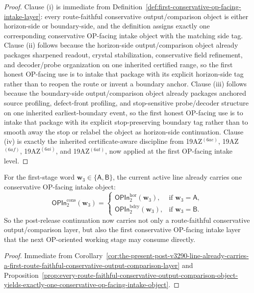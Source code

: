 \begin{proof}
Clause (i) is immediate from Definition~\ref{def:first-conservative-op-facing-intake-layer}: every route-faithful conservative output/comparison object is either horizon-side or boundary-side, and the definition assigns exactly one corresponding conservative OP-facing intake object with the matching side tag. Clause (ii) follows because the horizon-side output/comparison object already packages sharpened readout, crystal stabilization, conservative field refinement, and decoder/probe organization on one inherited certified range, so the first honest OP-facing use is to intake that package with its explicit horizon-side tag rather than to reopen the route or invent a boundary anchor. Clause (iii) follows because the boundary-side output/comparison object already packages anchored source profiling, defect-front profiling, and stop-sensitive probe/decoder structure on one inherited earliest-boundary event, so the first honest OP-facing use is to intake that package with its explicit stop-preserving boundary tag rather than to smooth away the stop or relabel the object as horizon-side continuation. Clause (iv) is exactly the inherited certificate-aware discipline from 19AZ$^{(6ae)}$, 19AZ$^{(6af)}$, 19AZ$^{(6ai)}$, and 19AZ$^{(6at)}$, now applied at the first OP-facing intake level.
\end{proof}

\begin{corollary}
\label{cor:the-present-post-v3290-line-already-carries-a-first-conservative-op-facing-intake-layer}
For the first-stage word \(\mathbf w_3\in\{\mathsf A,\mathsf B\}\), the current active line already carries one conservative OP-facing intake object:
\[
 \mathsf{OPIn}^{\mathrm{cons}}_{2}(\mathbf w_3)
 =
 \begin{cases}
 \mathsf{OPIn}^{\mathrm{hor}}_{2}(\mathbf w_3), & \text{if }\mathbf w_3=\mathsf A,\\[2mm]
 \mathsf{OPIn}^{\mathrm{bdry}}_{2}(\mathbf w_3), & \text{if }\mathbf w_3=\mathsf B.
 \end{cases}
\]
So the post-release continuation now carries not only a route-faithful conservative output/comparison layer, but also the first conservative OP-facing intake layer that the next OP-oriented working stage may consume directly.
\end{corollary}

\begin{proof}
Immediate from Corollary~\ref{cor:the-present-post-v3290-line-already-carries-a-first-route-faithful-conservative-output-comparison-layer} and Proposition~\ref{prop:every-route-faithful-conservative-output-comparison-object-yields-exactly-one-conservative-op-facing-intake-object}.
\end{proof}


